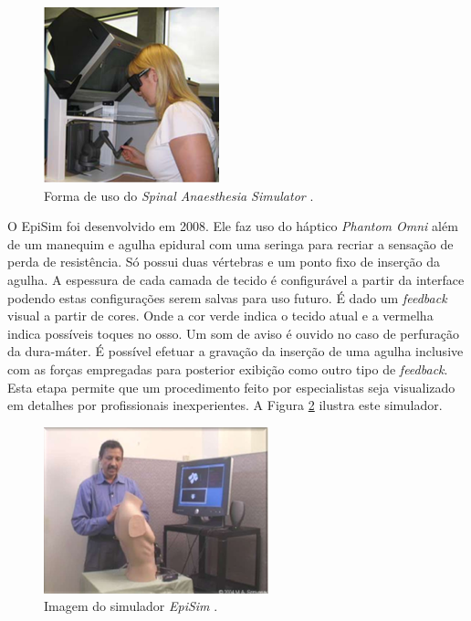 \begin{figure}[ht!]
    \centering
    \includegraphics[width=0.3\linewidth]{capitulos/figuras/spinalAnestesiaSim.png} 
    \caption{Forma de uso do \textit{Spinal Anaesthesia Simulator}  \cite{Dreifaldt2006}.}
    \label{fig:spinalAnestesiaSim}
\end{figure}

O EpiSim \cite{YantricInc2011} foi desenvolvido em 2008. Ele faz uso do háptico \textit{Phantom Omni} além de um manequim e agulha epidural com uma seringa para recriar a sensação de perda de resistência. Só possui duas vértebras e um ponto fixo de inserção da agulha. A espessura de cada camada de tecido é configurável a partir da interface podendo estas configurações serem salvas para uso futuro. É dado um \textit{feedback} visual a partir de cores. Onde a cor verde indica o tecido atual e a vermelha indica possíveis toques no osso. Um som de aviso é ouvido no caso de perfuração da dura-máter. É possível efetuar a gravação da inserção de uma agulha inclusive com as forças empregadas para posterior exibição como outro tipo de \textit{feedback}. Esta etapa permite que um procedimento feito por especialistas seja visualizado em detalhes por profissionais inexperientes. A Figura \ref{fig:epiSim} ilustra este simulador.

\begin{figure}[ht!]
    \centering
    \includegraphics[width=0.4\linewidth]{capitulos/figuras/epiSim.png} 
    \caption{Imagem do simulador \textit{EpiSim} \cite{Frazzetto2011}.}
    \label{fig:epiSim}
\end{figure}

